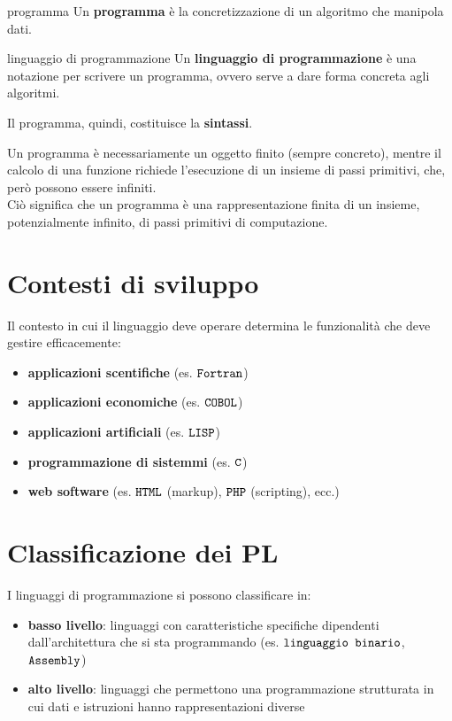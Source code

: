 \begin{mydef}{programma}
    Un \textbf{programma} è la concretizzazione di un algoritmo che manipola dati.
\end{mydef}

\begin{mydef}{linguaggio di programmazione}
    Un \textbf{linguaggio di programmazione} è una notazione per scrivere un programma, ovvero serve a dare forma concreta agli algoritmi.
\end{mydef}

Il programma, quindi, costituisce la \textcolor{colore}{\textbf{sintassi}}.

Un programma è necessariamente un oggetto finito (sempre concreto), mentre il calcolo di una funzione richiede l'esecuzione di un insieme di passi primitivi, che, però possono essere infiniti.\\[0.2ex]
Ciò significa che un programma è una rappresentazione finita di un insieme, potenzialmente infinito, di passi primitivi di computazione.


\section{Contesti di sviluppo}
Il contesto in cui il linguaggio deve operare determina le funzionalità che deve gestire efficacemente:
\begin{itemize}[label=$\triangleright$, itemsep=\smallskipamount]
    \item \textbf{applicazioni scentifiche} (es. $\verb|Fortran|$)
    \item \textbf{applicazioni economiche} (es. $\verb|COBOL|$)
    \item \textbf{applicazioni artificiali} (es. $\verb|LISP|$)
    \item \textbf{programmazione di sistemmi} (es. $\verb|C|$)
    \item \textbf{web software} (es. $\verb|HTML|$ (markup), $\verb|PHP|$ (scripting), ecc.)
\end{itemize}

\section{Classificazione dei PL}
I linguaggi di programmazione si possono classificare in:
\begin{itemize}[label=$\diamond$, itemsep=\smallskipamount]
    \item \textcolor{colore}{\textbf{basso livello}}: linguaggi con caratteristiche specifiche dipendenti dall'architettura che si sta programmando (es. $\verb|linguaggio binario|$, $\verb|Assembly|$)
    \item \textcolor{colore}{\textbf{alto livello}}: linguaggi che permettono una programmazione strutturata in cui dati e istruzioni hanno rappresentazioni diverse
\end{itemize}

